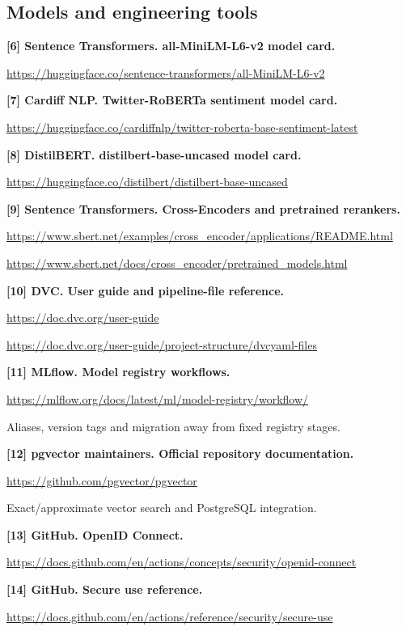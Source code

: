 \documentclass[10pt,letterpaper]{article}
\newcommand{\key}[1]{\textbf{\color{ink}#1}}
\begin{document}
\clearpage
\subsection{Models and engineering tools}
\hypertarget{src6}{}\key{[6] Sentence Transformers. all-MiniLM-L6-v2 model card.}\par
\url{https://huggingface.co/sentence-transformers/all-MiniLM-L6-v2}

\hypertarget{src7}{}\key{[7] Cardiff NLP. Twitter-RoBERTa sentiment model card.}\par
\url{https://huggingface.co/cardiffnlp/twitter-roberta-base-sentiment-latest}

\hypertarget{src8}{}\key{[8] DistilBERT. distilbert-base-uncased model card.}\par
\url{https://huggingface.co/distilbert/distilbert-base-uncased}

\hypertarget{src9}{}\key{[9] Sentence Transformers. Cross-Encoders and pretrained rerankers.}\par
\url{https://www.sbert.net/examples/cross_encoder/applications/README.html}\par
\url{https://www.sbert.net/docs/cross_encoder/pretrained_models.html}

\hypertarget{src10}{}\key{[10] DVC. User guide and pipeline-file reference.}\par
\url{https://doc.dvc.org/user-guide}\par
\url{https://doc.dvc.org/user-guide/project-structure/dvcyaml-files}

\hypertarget{src11}{}\key{[11] MLflow. Model registry workflows.}\par
\url{https://mlflow.org/docs/latest/ml/model-registry/workflow/}\par
Aliases, version tags and migration away from fixed registry stages.

\hypertarget{src12}{}\key{[12] pgvector maintainers. Official repository documentation.}\par
\url{https://github.com/pgvector/pgvector}\par
Exact/approximate vector search and PostgreSQL integration.

\hypertarget{src13}{}\key{[13] GitHub. OpenID Connect.}\par
\url{https://docs.github.com/en/actions/concepts/security/openid-connect}

\hypertarget{src14}{}\key{[14] GitHub. Secure use reference.}\par
\url{https://docs.github.com/en/actions/reference/security/secure-use}
\end{document}
